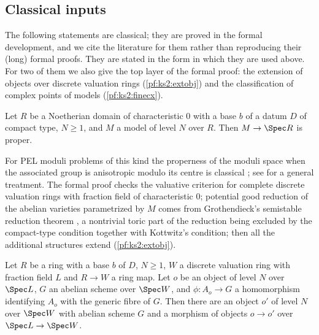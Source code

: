 \subsection{Classical inputs}\label{pf:ks2:sec:classical}

The following statements are classical; they are proved in the formal development, and we cite
the literature for them rather than reproducing their (long) formal proofs. They are stated in the
form in which they are used above. For two of them we also give the top layer of the formal proof:
the extension of objects over discrete valuation rings (\cref{pf:ks2:extobj}) and the
classification of complex points of models (\cref{pf:ks2:finecx}).

\begin{littheorem}\label{pf:ks2:classical:proper}
Let $R$ be a Noetherian domain of characteristic $0$ with a base $b$ of a datum $D$ of compact
type, $N\ge1$, and $M$ a model of level $N$ over $R$. Then $M\to\Spec R$ is proper.
\end{littheorem}

For PEL moduli problems of this kind the properness of the moduli space when the associated group
is anisotropic modulo its centre is classical \cite{Kottwitz1992}; see \cite{Lan2013} for a general
treatment. The formal proof checks the valuative criterion for complete discrete valuation rings
with fraction field of characteristic $0$; potential good reduction of the abelian varieties
parametrized by $M$ comes from Grothendieck's semistable reduction theorem
\cite[Exp.~IX]{Grothendieck1972}, a nontrivial toric part of the reduction being excluded by the
compact-type condition together with Kottwitz's condition; then all the additional structures
extend (\cref{pf:ks2:extobj}).

\begin{proposition}\label{pf:ks2:extobj}
Let $R$ be a ring with a base $b$ of $D$, $N\ge1$, $W$ a discrete valuation ring with fraction field
$L$ and $R\to W$ a ring map. Let $o$ be an object of level $N$ over $\Spec L$, $G$ an abelian scheme
over $\Spec W$, and $\phi\colon A_o\to G$ a homomorphism identifying $A_o$ with the generic fibre of
$G$. Then there are an object $o'$ of level $N$ over $\Spec W$ with abelian scheme $G$ and a morphism of
objects $o\to o'$ over $\Spec L\to\Spec W$.
\end{proposition}

